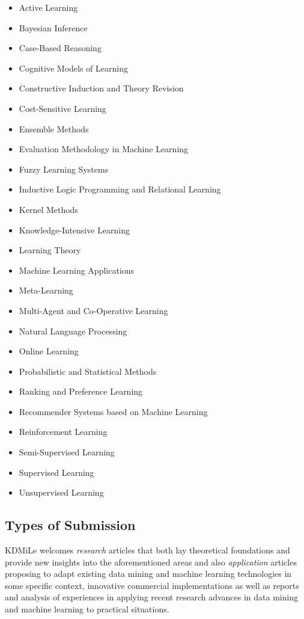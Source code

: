 \documentclass[kdmile,a4paper]{kdmile} %
\begin{document}
\begin{enumerate}
\begin{itemize}
\item Active Learning
\item Bayesian Inference
\item Case-Based Reasoning
\item Cognitive Models of Learning
\item Constructive Induction and Theory Revision
\item Cost-Sensitive Learning
\item Ensemble Methods
\item Evaluation Methodology in Machine Learning
\item Fuzzy Learning Systems
\item Inductive Logic Programming and Relational Learning
\item Kernel Methods
\item Knowledge-Intensive Learning 
\item Learning Theory
\item Machine Learning Applications
\item Meta-Learning
\item Multi-Agent and Co-Operative Learning
\item Natural Language Processing
\item Online Learning
\item Probabilistic and Statistical Methods
\item Ranking and Preference Learning
\item Recommender Systems based on Machine Learning
\item Reinforcement Learning
\item Semi-Supervised Learning
\item Supervised Learning
\item Unsupervised Learning
\end{itemize}

\end{enumerate}

\subsection{Types of Submission}

KDMiLe welcomes \textit{research} articles that both lay theoretical foundations and provide new insights into the aforementioned areas and also \textit{application} articles proposing to adapt existing data mining and machine learning technologies in some specific context, innovative commercial  implementations as well as reports and analysis of experiences in applying recent research advances in data mining and machine learning  to practical situations.
\end{document}
